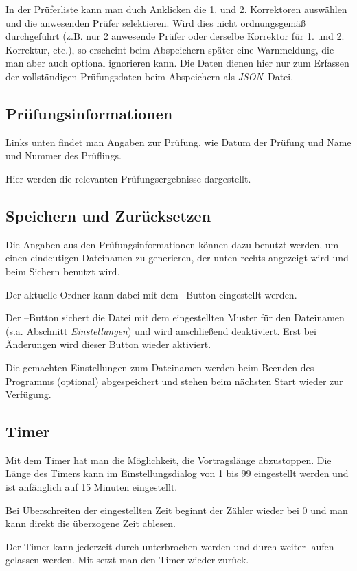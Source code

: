\documentclass[a4paper,notitlepage,parskip=half]{scrartcl}
\begin{document}
In der Prüferliste kann man duch Anklicken die 1. und 2. Korrektoren auswählen und die anwesenden Prüfer selektieren. Wird dies nicht ordnungsgemäß durchgeführt (z.B. nur 2 anwesende Prüfer oder derselbe Korrektor für 1. und 2. Korrektur, etc.), so erscheint beim Abspeichern später eine Warnmeldung, die man aber auch optional ignorieren kann. Die Daten dienen hier nur zum Erfassen der vollständigen Prüfungsdaten beim Abspeichern als \emph{JSON}--Datei.

\subsection{Prüfungsinformationen}
Links unten findet man Angaben zur Prüfung, wie Datum der Prüfung und Name und Nummer des Prüflings.

Hier werden die relevanten Prüfungsergebnisse dargestellt.

\subsection{Speichern und Zurücksetzen}
Die Angaben aus den Prüfungsinformationen können dazu benutzt werden, um einen eindeutigen Dateinamen zu generieren, der unten rechts angezeigt wird und beim Sichern benutzt wird.

Der aktuelle Ordner kann dabei mit dem --Button eingestellt werden.

Der --Button sichert die Datei mit dem eingestellten Muster für den Dateinamen (s.a. Abschnitt \emph{Einstellungen}) und wird anschließend deaktiviert. Erst bei Änderungen wird dieser Button wieder aktiviert.

Die gemachten Einstellungen zum Dateinamen werden beim Beenden des Programms (optional) abgespeichert und stehen beim nächsten Start wieder zur Verfügung.

\subsection{Timer}
Mit dem Timer hat man die Möglichkeit, die Vortragslänge abzustoppen.
Die Länge des Timers kann im Einstellungsdialog von 1 bis 99 eingestellt werden und ist anfänglich auf 15 Minuten eingestellt.

Bei Überschreiten der eingestellten Zeit beginnt der Zähler wieder bei 0 und man kann direkt die überzogene Zeit ablesen.

Der Timer kann jederzeit durch  unterbrochen werden und durch  weiter laufen gelassen werden. Mit  setzt man den Timer wieder zurück.
\end{document}
